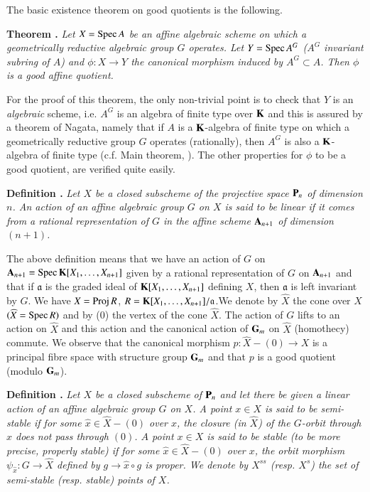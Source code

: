 \eject

The basic existence theorem on good quotients is the following.

\medskip
\noindent
{\bf Theorem .\label{art18-thm2}}
{\em Let $X=\operatorname{Spec} A$ be an affine algebraic scheme on which a geometrically reductive algebraic group $G$ operates. Let $Y=\operatorname{Spec} A^{G}$ ($A^{G}$ invariant subring of $A$) and $\phi:X\to Y$ the canonical morphism induced by $A^{G}\subset A$. Then $\phi$ is a good affine quotient.}
\smallskip

For the proof of this theorem, the only non-trivial point is to check that $Y$ is an {\em algebraic} scheme, i.e. $A^{G}$ is an algebra of finite type over $\mathbf{K}$ and this is assured by a theorem of Nagata, namely that if $A$ is a $\mathbf{K}$-algebra of finite type on which a geometrically reductive group $G$ operates (rationally), then $A^{G}$ is also a $\mathbf{K}$-algebra of finite type (c.f. Main theorem, \cite{art18-key6}). The other properties for $\phi$ to be a good quotient, are verified quite easily.

\medskip
\noindent
{\bf Definition .\label{art18-defi5}}
{\em Let $X$ be a closed subscheme of the projective space $\mathbf{P}_{n}$ of dimension $n$. An action of an affine algebraic group $G$ on $X$ is said to be linear if it comes from a rational representation of $G$ in the affine scheme $\mathbf{A}_{n+1}$ of dimension $(n+1)$.}
\smallskip

The above definition means that we have an action of $G$ on $\mathbf{A}_{n+1}=\operatorname{Spec} \mathbf{K}[X_{1},\ldots,X_{n+1}]$ given by a rational representation of $G$ on $\mathbf{A}_{n+1}$ and that if $\mathfrak{a}$ is the graded ideal of $\mathbf{K}[X_{1},\ldots,X_{n+1}]$ defining $X$, then $\mathfrak{a}$ is left invariant by $G$. We have $X=\operatorname{\mathrm{Proj}} R$, $R=\mathbf{K}[X_{1},\ldots,X_{n+1}]/\mathfrak{a}$.\pageoriginale We denote by $\widehat{X}$ the cone over $X$ $(\widehat{X}=\operatorname{Spec} R)$ and by (0) the vertex of the cone $\widehat{X}$. The action of $G$ lifts to an action on $\widehat{X}$ and this action and the canonical action of $\mathbf{G}_{m}$ on $\widehat{X}$ (homothecy) commute. We observe that the canonical morphism $p:\widehat{X}-(0)\to X$ is a principal fibre space with structure group $\mathbf{G}_{m}$ and that $p$ is a good quotient (modulo $\mathbf{G}_{m}$).

\medskip
\noindent
{\bf Definition .\label{art18-defi6}}
{\em Let $X$ be a closed subscheme of $\mathbf{P}_{n}$ and let there be given a linear action of an affine algebraic group $G$ on $X$. A point $x\in X$ is said to be semi-stable if for some $\widehat{x}\in \widehat{X}-(0)$ over $x$, the closure (in $\widehat{X}$) of the $G$-orbit through $\widehat{x}$ does not pass through $(0)$. $A$ point $x\in X$ is said to be stable (to be more precise, properly stable) if for some $\widehat{x}\in \widehat{X}-(0)$ over $x$, the orbit morphism $\psi_{\widehat{x}}:G\to \widehat{X}$ defined by $g\to \widehat{x}\circ g$ is proper. We denote by $X^{ss}$ (resp. $X^{s}$) the set of semi-stable (resp. stable) points of $X$.}
\smallskip

